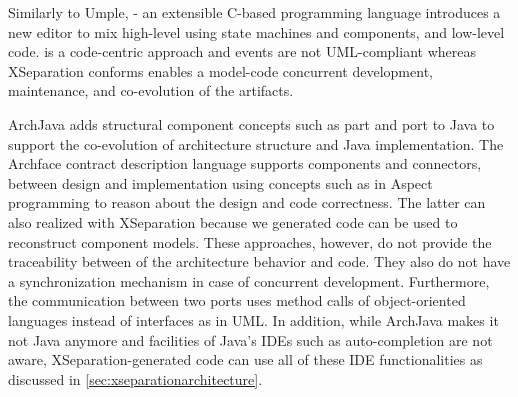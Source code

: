 Similarly to Umple,  \cite{voelter2012mbeddr} - an extensible C-based programming language introduces a new editor to mix high-level using state machines and components, and low-level code. 
 is a code-centric approach and events are not UML-compliant whereas XSeparation conforms enables a model-code concurrent development, maintenance, and co-evolution of the artifacts.  

ArchJava \cite{aldrich2002archjava} adds structural component concepts such as part and port to Java to support the co-evolution of architecture structure and Java implementation. 
The Archface \cite{ubayashi2010archface} contract description language supports components and connectors, between design and implementation using concepts such as  in Aspect programming to reason about the design and code correctness.
The latter can also realized with XSeparation because we generated code can be used to reconstruct component models.
These approaches, however, do not provide the traceability between of the architecture behavior and code.
They also do not have a synchronization mechanism in case of concurrent development.
Furthermore, the communication between two ports uses method calls of object-oriented languages instead of interfaces as in UML.
In addition, while ArchJava makes it not Java anymore and facilities of Java's IDEs such as auto-completion are not aware, XSeparation-generated code can use all of these IDE functionalities as discussed in \ref{sec:xseparationarchitecture}.





%